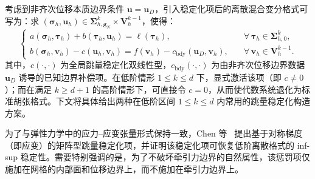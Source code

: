 考虑到非齐次位移本质边界条件 $\boldsymbol{u} = \boldsymbol{u}_D$，引入稳定化项后的离散混合变分格式可写为：求 $(\boldsymbol{\sigma}_h,\boldsymbol{u}_h)\in \boldsymbol{\Sigma}_{h,\boldsymbol{g}_N}^k\times \boldsymbol{V}_h^{k-1}$，使得：
\begin{equation} \label{eq:ch5_stabilized_weak_form}
	\begin{cases}
		a(\boldsymbol{\sigma}_h,\boldsymbol{\tau}_h)+b(\boldsymbol{\tau}_h,\boldsymbol{u}_h)=\ell(\boldsymbol{\tau}_h),&\quad \forall\,\boldsymbol{\tau}_h\in\boldsymbol{\Sigma}_{h,0}^k,\\
		b(\boldsymbol{\sigma}_h,\boldsymbol{v}_h) - c(\boldsymbol{u}_h,\boldsymbol{v}_h)= f(\boldsymbol{v}_h) - c_{\text{bdy}}(\boldsymbol{u}_D, \boldsymbol{v}_h),&\quad \forall\,\boldsymbol{v}_h\in\boldsymbol{V}_{h}^{k-1}. 
	\end{cases}
\end{equation}
其中，$c(\cdot,\cdot)$ 为全局跳量稳定化双线性型，$c_{\text{bdy}}(\cdot,\cdot)$ 为由非齐次位移边界数据 $\boldsymbol{u}_D$ 诱导的已知边界补偿项。在低阶情形 $1\le k\le d$ 下，显式激活该项（即 $c \neq 0$）；而在满足 $k\ge d+1$ 的高阶情形下，可直接令 $c=0$，从而使代数系统退化为标准胡张格式。下文将具体给出两种在低阶区间 $1\le k\le d$ 内常用的跳量稳定化构造方案。

为了与弹性力学中的应力--应变张量形式保持一致，Chen 等~\cite{chenStabilizedMixedFinite2017a} 提出基于对称梯度（即应变）的矩阵型跳量稳定化项，并证明该稳定化项可恢复低阶离散格式的 inf-sup 稳定性。需要特别强调的是，为了不破坏牵引力边界的自然属性，该惩罚项仅施加在网格的内部面和位移边界上，而不施加在牵引力边界上。

